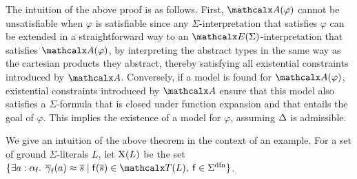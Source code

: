The intuition of the above proof is as follows.
First, $\conv( \varphi )$ cannot be unsatisfiable when $\varphi$ is satisfiable
since any $\Sigma$-interpretation that satisfies $\varphi$ can be extended in a straightforward way to
an $\extendsig{\Sigma}$-interpretation that satisfies $\conv( \varphi )$, by
interpreting the abstract types in the same way as the cartesian products they
abstract, thereby satisfying all existential constraints introduced by $\conv$.
Conversely, if a model is found for $\conv( \varphi )$,
existential constraints
introduced by $\conv$ ensure that this model also satisfies
a $\Sigma$-formula that is closed under function expansion and
that entails the goal of $\varphi$.
This implies the existence of a model for $\varphi$,
assuming $\DDD$ is admissible.

\begin{conf}
We give an intuition of the above theorem in the context of an example.
For a set of ground $\Sigma$-literals $L$, let $\mathrm{X}( L )$ be the set
$\{ \exists a : {\fargtype{\con{f}}}.\;\, \vecfarg{\con{f}}( a ) \teq \vec s
\mid \con{f}( \vec s ) \in \terms( L ),\: \con{f} \in \sfundefs{\Sigma}
\}$.
\end{conf}

